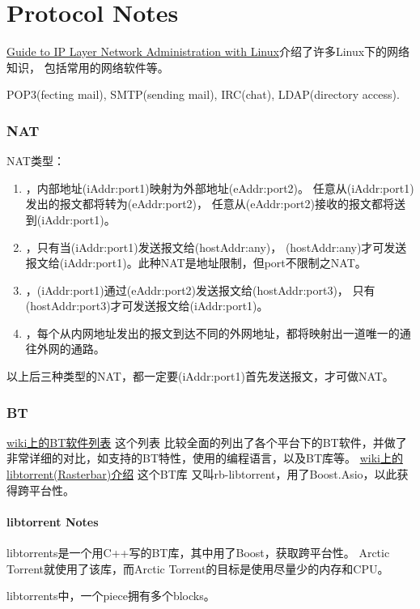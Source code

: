\part{Protocol Notes}
\noindent\href{http://linux-ip.net/html/}{Guide to IP Layer Network Administration with Linux}介绍了许多Linux下的网络知识，
包括常用的网络软件等。

POP3(fecting mail), SMTP(sending mail), IRC(chat), LDAP(directory access).

\section{NAT}
NAT类型：
\begin{enumerate}
\item {}，内部地址(iAddr:port1)映射为外部地址(eAddr:port2)。
任意从(iAddr:port1)发出的报文都将转为(eAddr:port2)，
任意从(eAddr:port2)接收的报文都将送到(iAddr:port1)。
\item {}，只有当(iAddr:port1)发送报文给(hostAddr:any)，
(hostAddr:any)才可发送报文给(iAddr:port1)。此种NAT是地址限制，但port不限制之NAT。
\item {}，(iAddr:port1)通过(eAddr:port2)发送报文给(hostAddr:port3)，
只有(hostAddr:port3)才可发送报文给(iAddr:port1)。
\item {}，每个从内网地址发出的报文到达不同的外网地址，都将映射出一道唯一的通往外网的通路。
\end{enumerate}
以上后三种类型的NAT，都一定要(iAddr:port1)首先发送报文，才可做NAT。

\section{BT}
\noindent\href{http://en.wikipedia.org/wiki/Comparison\_of\_BitTorrent\_software}{wiki上的BT软件列表} 这个列表
比较全面的列出了各个平台下的BT软件，并做了非常详细的对比，如支持的BT特性，使用的编程语言，以及BT库等。
\noindent\href{http://en.wikipedia.org/wiki/Libtorrent\_(Rasterbar)}{wiki上的libtorrent(Rasterbar)介绍} 这个BT库
又叫rb-libtorrent，用了Boost.Asio，以此获得跨平台性。

\subsection{libtorrent Notes}
libtorrents是一个用C++写的BT库，其中用了Boost，获取跨平台性。
Arctic Torrent就使用了该库，而Arctic Torrent的目标是使用尽量少的内存和CPU。

libtorrents中，一个piece拥有多个blocks。
